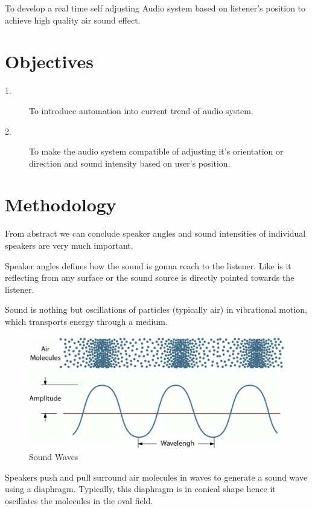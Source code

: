 \documentclass[twocolumn]{report}
\begin{document}
To develop a real time self adjusting Audio system based on listener's 
position to achieve high quality air sound effect.

\section{Objectives}

\begin{description}
    \item[1.]To introduce automation into current trend of audio system.
    \item[2.]To make the audio system compatible of adjusting it’s 
                orientation or direction and sound intensity based on user's 
                position.
\end{description}

\section{Methodology}

From abstract we can conclude speaker angles and sound intensities of individual 
speakers are very much important.

Speaker angles defines how the sound is gonna reach to the listener. Like is it 
reflecting from any surface or the sound source is directly pointed towards the listener.

Sound is nothing but oscillations of particles (typically air) in vibrational motion, which
transports energy through a medium.

\begin{figure}
    \includegraphics[width=\columnwidth]{sound_waves.png}
    \caption{Sound Waves}
\end{figure}

\FloatBarrier

Speakers push and pull surround air molecules in waves to generate a sound wave using a diaphragm.
Typically, this diaphragm is in conical shape hence it oscillates the molecules in the oval field. 
\end{document}
